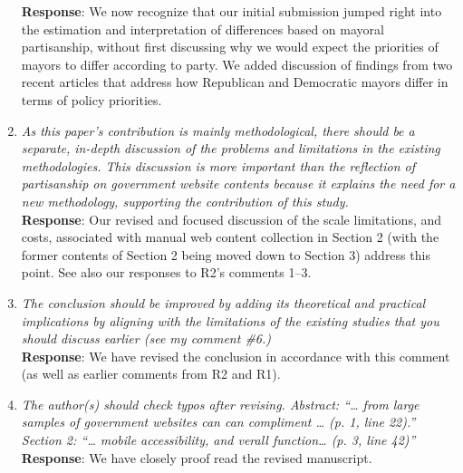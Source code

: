 \documentclass[12pt,titlepage]{article}
\begin{document}
\begin{enumerate}
    \textbf{Response}: We now recognize that our initial submission jumped right into the estimation and interpretation of differences based on mayoral partisanship, without first discussing why we would expect the priorities of mayors to differ according to party. We added discussion of findings from two recent articles that address how Republican and Democratic mayors differ in terms of policy priorities.
    
    \item \emph{As this paper’s contribution is mainly methodological, there should be a separate, in-depth discussion of the problems and limitations in the existing methodologies. This discussion is more important than the reflection of partisanship on government website contents because it explains the need for a new methodology, supporting the contribution of this study.}\\

    \textbf{Response}:  Our revised and focused discussion of the scale limitations, and costs, associated with manual web content collection in Section 2 (with the former contents of Section 2 being moved down to Section 3) address this point. See also our responses to R2's comments 1--3.
    
        \item \emph{The conclusion should be improved by adding its theoretical and practical implications by aligning with the limitations of the existing studies that you should discuss earlier (see my comment \#6.)}\\

    \textbf{Response}:  We have revised the conclusion in accordance with this comment (as well as earlier comments from R2 and R1). 
    
    
            \item \emph{The author(s) should check typos after revising. Abstract: “… from large samples of government websites can can compliment … (p. 1, line 22).” Section 2: “… mobile accessibility, and verall function… (p. 3, line 42)”}\\

    \textbf{Response}: We have closely proof read the revised manuscript.


    

\end{enumerate}





\newpage
\singlespacing
%
% 
\end{document}
